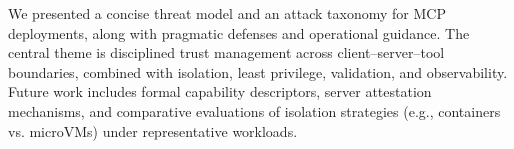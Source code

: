 We presented a concise threat model and an attack taxonomy for MCP deployments, along with pragmatic defenses and operational guidance. The central theme is disciplined trust management across client–server–tool boundaries, combined with isolation, least privilege, validation, and observability. Future work includes formal capability descriptors, server attestation mechanisms, and comparative evaluations of isolation strategies (e.g., containers vs. microVMs) under representative workloads.

